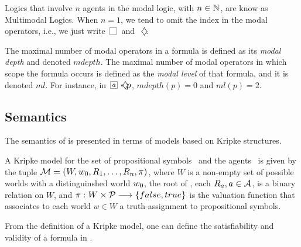 Logics that involve $n$ agents in the modal logic, with $n \in \Nat$, are know
as Multimodal Logics. When $n = 1$, we tend to omit the index in the modal
operators, i.e., we just write $\nec{}$ and $\pos{}$.


The maximal number of modal operators in a formula is defined as its \emph{modal
depth} and denoted $mdepth$. The maximal number of modal operators in which
scope the formula occurs is defined as the \emph{modal level} of that formula,
and it is denoted $ml$.
For instance, in $\nec{a}\pos{a} p$, $mdepth(p) = 0$ and $ml(p) = 2$.

\subsection{Semantics}
\label{sec:semantics}

The semantics of  is presented in terms of models based on Kripke
structures.

\begin{definition}
    A Kripke model for the set of propositional symbols \Prop~and the agents
    \Agents~is given by the tuple $\Model = (W, \st_0, R_1, \ldots, R_n, \pi)$,
    where $W$ is a non-empty set of possible worlds with a distinguinshed world
    $\st_0$, the root of \Model, each $R_a, a \in \Agents$, is a binary relation
    on $W$, and $\pi: W \times \Prop \longrightarrow \{false, true\}$ is the
    valuation function that associates to each world $w \in W$ a
    truth-assignment to propositional symbols.
\end{definition}

From the definition of a Kripke model, one can define the satisfiability and
validity of a formula in .


